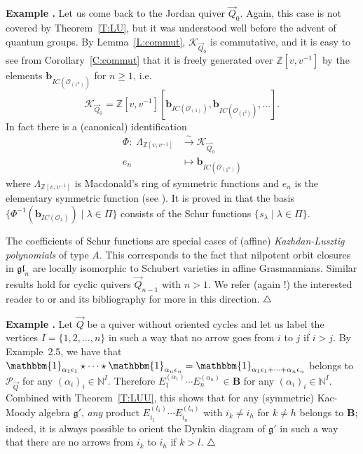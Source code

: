 \documentclass[a4paper,10pt]{amsart}
\def\endexample{$\hfill \triangle$}
\def\Z{\mathbb{Z}}
\def\endexample{$\hfill \triangle$}
\def\N{\mathbb{N}}
\def\a{\alpha}
\def\g{\mathfrak{g}}
\def\PQ{\mathcal{P}_{\vec{Q}}}
\numberwithin{equation}{section}
\begin{document}
\vspace{.2in}

\addtocounter{theo}{1}
\noindent \textbf{Example \thetheo .} Let us come back to the Jordan quiver $\vec{Q}_0$. Again, this case is not covered by Theorem~\ref{T:LU}, but it was understood well before the advent of quantum groups. By Lemma~\ref{L:commut}, $\mathcal{K}_{\vec{Q}_0}$ is commutative, and it is easy to see from Corollary~\ref{C:commut} that it is freely generated over $\Z[v,v^{-1}]$ by the elements $\mathbf{b}_{IC(\mathcal{O}_{(1^n)})}$ for $n \geq 1$, i.e.
$$\mathcal{K}_{\vec{Q}_0} =\Z[v,v^{-1}] [ \mathbf{b}_{IC(\mathcal{O}_{(1)})}, \mathbf{b}_{IC(\mathcal{O}_{(1^2)})}, \ldots].$$
In fact there is a (canonical) identification
\begin{equation*}
\begin{split}
\Phi:\; \Lambda_{\Z[v,v^{-1}]} & \stackrel{\sim}{\to} \mathcal{K}_{\vec{Q}_0} \\
e_n &\mapsto \mathbf{b}_{IC(\mathcal{O}_{(1^n)})}
\end{split}
\end{equation*}
where $\Lambda_{\Z[v,v^{-1}]}$ is Macdonald's ring of symmetric functions and $e_n$ is the elementary
symmetric function (see \cite{Mac}). It is proved in \cite{LusztigGreen} that the basis $\big\{ \Phi^{-1}(\mathbf{b}_{IC(\mathcal{O}_{\lambda})})\;|\; \lambda \in \Pi\big\}$ consists of the Schur functions $\big\{s_{\lambda}\;|\; \lambda \in \Pi\big\}$.

\vspace{.1in}

The coefficients of Schur functions are special cases of (affine) \textit{Kazhdan-Lusztig polynomials} of type $A$. This corresponds to the fact that nilpotent orbit closures in $\mathfrak{gl}_n$ are locally isomorphic to Schubert varieties in affine Grasmannians. Similar results hold for cyclic quivers $\vec{Q}_{n-1}$ with $n>1$. We refer (again !) the interested reader to \cite[Lecture~2]{Trieste} or \cite{Quiversurvey} and its bibliography for more in this direction. 
\endexample

\vspace{.2in}

\addtocounter{theo}{1}
\noindent \textbf{Example \thetheo .} Let $\vec{Q}$ be a quiver without oriented cycles and let us label the vertices $I=\{1,2, \ldots, n\}$ in such a way that no arrow goes from $i$ to $j$ if $i >j$. By Example~2.5, we have that $\mathbbm{1}_{\a_1\epsilon_1} \star \cdots \star \mathbbm{1}_{\a_n\epsilon_n}=\mathbbm{1}_{\a_1\epsilon_1+ \cdots + \a_n\epsilon_n}$ belongs to $\PQ$ for any $(\a_i)_i \in \N^I$. Therefore
$E_1^{(\a_1)} \cdots E_n^{(\a_n)} \in \mathbf{B}$ for any $(\a_i)_i \in \N^I$. Combined with Theorem~\ref{T:LUU}, this shows that for any (symmetric) Kac-Moody algebra $\g'$, \textit{any} product $E_{i_1}^{(l_1)} \cdots E_{i_n}^{(l_n)}$ with $i_k \neq i_h$ for $k \neq h$ belongs to $\mathbf{B}$; indeed, it is always possible to orient the Dynkin diagram of $\g'$ in such a way that there are no arrows from $i_k$ to $i_h$ if $k >l$.
\endexample
\end{document}
